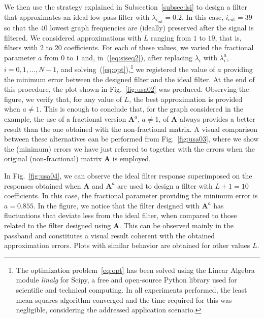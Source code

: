 We then use the strategy explained in Subsection~\ref{subsec:lsi} to design a filter that approximates an ideal low-pass filter with $\lambda_{i_\text{cut}}=0.2$. In this case, $i_\text{cut}=39$ so that the $40$ lowest graph frequencies are (ideally) preserved after the signal is filtered. We considered approximations with $L$ ranging from $1$ to $19$, that is, filters with $2$ to $20$ coefficients. For each of these values, we varied the fractional parameter $a$ from $0$ to $1$ and, in~(\ref{eq:siseq2}), after replacing $\lambda_i$ with $\lambda_i^a$, $i=0,1,\ldots,N-1$, and solving~(\ref{eq:opt}),\footnote{The optimization problem~\ref{eq:opt} has been solved using the Linear Algebra module \emph{linalg} for Scipy, a free and open-source Python library used for scientific and technical computing. In all experiments performed, the least mean squares algorithm converged and the time required for this was negligible, considering the addressed application scenario.} we registered the value of $a$ providing the minimum error between the designed filter and the ideal filter. At the end of this procedure, the plot shown in Fig.~\ref{fig:usa02} was produced. Observing the figure, we verify that, for any value of $L$, the best approximation is provided when $a\neq1$. This is enough to conclude that, for the graph considered in the example, the use of a fractional version $\mathbf{A}^a$, $a\neq 1$, of $\mathbf{A}$ always provides a better result than the one obtained with the non-fractional matrix. A visual comparison between these alternatives can be performed from Fig.~\ref{fig:usa03}, where we show the (minimum) errors we have just referred to together with the errors when the original (non-fractional) matrix $\mathbf{A}$ is employed.

In Fig.~\ref{fig:usa04}, we can observe the ideal filter response superimposed on the responses obtained when $\mathbf{A}$ and $\mathbf{A}^a$ are used to design a filter with $L+1=10$ coefficients. In this case, the fractional parameter providing the minimum error is $a=0.855$. In the figure, we notice that the filter designed with $\mathbf{A}^a$ has fluctuations that deviate less from the ideal filter, when compared to those related to the filter designed using $\mathbf{A}$. This can be observed mainly in the passband and constitutes a visual result coherent with the obtained approximation errors. Plots with similar behavior are obtained for other values $L$.

